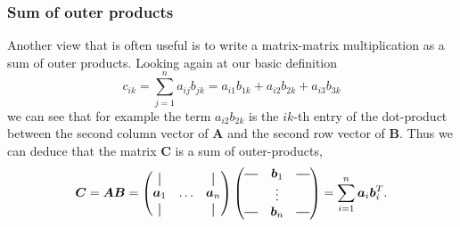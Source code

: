 \subsubsection{Sum of outer products}
Another view that is often useful is to 
write a matrix-matrix multiplication as a sum of outer products.
Looking again at our basic definition
\begin{equation}
    c_{ik} = \sum_{j=1}^n a_{ij} b_{jk} = a_{i1} b_{1k} + a_{i2} b_{2k} + a_{i3} b_{3k}
\end{equation}
we can see that for example the term $a_{i2} b_{2k}$ is the $ik$-th entry of the dot-product between
the second column vector of $\bm{A}$ and the second row vector of $\bm{B}$.
Thus we can deduce that the matrix $\bm{C}$ is a sum of outer-products,
\begin{equation}
    \bm{C} = \bm{AB} = \begin{pmatrix}
    \vertbar &        & \vertbar \\
    \bm{a}_1 & \hdots & \bm{a}_n \\
    \vertbar &        & \vertbar 
    \end{pmatrix}
    \begin{pmatrix}
        \horzbar & \bm{b}_1 & \horzbar \\
                  & \vdots   &  \\
        \horzbar & \bm{b}_n &  \horzbar \\
    \end{pmatrix}  = 
    \sum_{i=1}^n \bm{a}_i \bm{b}_i^T.
\end{equation}






